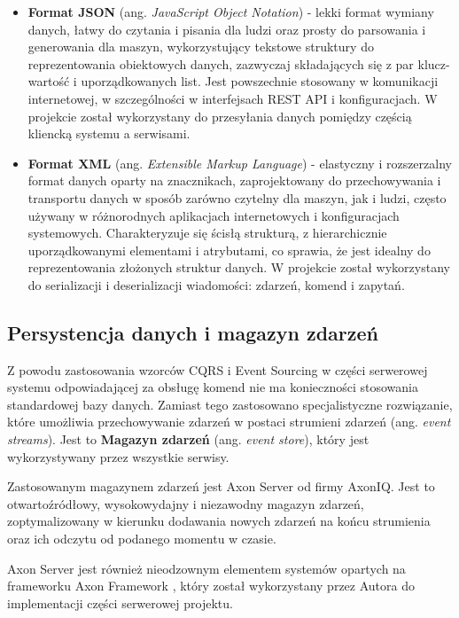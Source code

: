 \begin{itemize}
    \item \textbf{Format JSON} \cite{json} (ang. \textit{JavaScript Object Notation}) - lekki format wymiany danych, łatwy do czytania i pisania dla ludzi oraz prosty do parsowania i generowania dla maszyn, wykorzystujący tekstowe struktury do reprezentowania obiektowych danych, zazwyczaj składających się z par klucz-wartość i uporządkowanych list. Jest powszechnie stosowany w komunikacji internetowej, w szczególności w interfejsach REST API i konfiguracjach. W projekcie został wykorzystany do przesyłania danych pomiędzy częścią kliencką systemu a serwisami.
    
    \item \textbf{Format XML} (ang. \textit{Extensible Markup Language}) - elastyczny i rozszerzalny format danych oparty na znacznikach, zaprojektowany do przechowywania i transportu danych w sposób zarówno czytelny dla maszyn, jak i ludzi, często używany w różnorodnych aplikacjach internetowych i konfiguracjach systemowych. Charakteryzuje się ścisłą strukturą, z hierarchicznie uporządkowanymi elementami i atrybutami, co sprawia, że jest idealny do reprezentowania złożonych struktur danych. W projekcie został wykorzystany do serializacji i deserializacji wiadomości: zdarzeń, komend i zapytań.

\end{itemize}

\subsection{Persystencja danych i magazyn zdarzeń}

Z powodu zastosowania wzorców CQRS i Event Sourcing w części serwerowej systemu odpowiadającej za obsługę komend nie ma konieczności stosowania standardowej bazy danych. Zamiast tego zastosowano specjalistyczne rozwiązanie, które umożliwia przechowywanie zdarzeń w postaci strumieni zdarzeń (ang. \textit{event streams}). Jest to \textbf{Magazyn zdarzeń} (ang. \textit{event store}), który jest wykorzystywany przez wszystkie serwisy.

Zastosowanym magazynem zdarzeń jest Axon Server od firmy AxonIQ. Jest to otwartoźródłowy, wysokowydajny i niezawodny magazyn zdarzeń, zoptymalizowany w kierunku dodawania nowych zdarzeń na końcu strumienia oraz ich odczytu od podanego momentu w czasie.

Axon Server jest również nieodzownym elementem systemów opartych na frameworku Axon Framework \cite{axonframework}, który został wykorzystany przez Autora do implementacji części serwerowej projektu.

